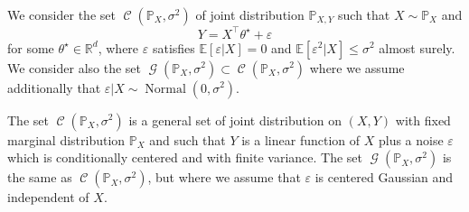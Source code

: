 \documentclass[
	fontsize=11pt, %
	twoside=false, %
	numbers=noenddot, %
]{kaobook}
\DeclareMathOperator{\cC}{{\mathcal C}}
\DeclareMathOperator{\cG}{{\mathcal G}}
\DeclareMathOperator{\nor}{Normal}
\newcommand{\eps}{\varepsilon}
\renewcommand{\P}{\mathbb P}
\newcommand{\E}{\mathbb E}
\newcommand{\R}{\mathbb R}
\begin{document}
\begin{definition}
	We consider the set $\cC(\P_X, \sigma^2)$ of joint distribution $\P_{X, Y}$ such that $X \sim \P_X$ and
	\begin{equation*}
		Y = X^\top \theta^\star + \eps
	\end{equation*}
	for some $ \theta^\star \in \R^d$, where $\eps$ satisfies $\E[\eps | X] = 0$ and $\E[\eps^2 | X] \leq \sigma^2$ almost surely. We consider also the set $\cG(\P_X, \sigma^2) \subset \cC(\P_X, \sigma^2)$ where we assume additionally that $\eps | X \sim \nor(0, \sigma^2)$.
\end{definition}
The set $\cC(\P_X, \sigma^2)$ is a general set of joint distribution on $(X, Y)$ with fixed marginal distribution $\P_X$ and such that $Y$ is a linear function of $X$ plus a noise $\eps$ which is conditionally centered and with finite variance. 
The set $\cG(\P_X, \sigma^2)$ is the same as $\cC(\P_X, \sigma^2)$, but where we assume that $\eps$ is centered Gaussian and independent of $X$.
\end{document}
